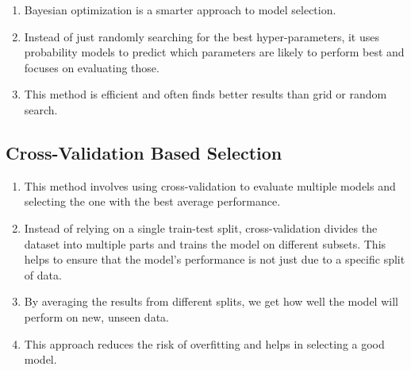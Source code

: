 \begin{enumerate}
    \item Bayesian optimization is a smarter approach to model selection.
    \hfill \cite{geeksforgeeks/machine-learning/model-selection-for-machine-learning}

    \item Instead of just randomly searching for the best hyper-parameters, it uses probability models to predict which parameters are likely to perform best and focuses on evaluating those.
    \hfill \cite{geeksforgeeks/machine-learning/model-selection-for-machine-learning}

    \item This method is efficient and often finds better results than grid or random search.
    \hfill \cite{geeksforgeeks/machine-learning/model-selection-for-machine-learning}
\end{enumerate}



\subsection{Cross-Validation Based Selection}

\begin{enumerate}
    \item This method involves using cross-validation to evaluate multiple models and selecting the one with the best average performance.
    \hfill \cite{geeksforgeeks/machine-learning/model-selection-for-machine-learning}

    \item Instead of relying on a single train-test split, cross-validation divides the dataset into multiple parts and trains the model on different subsets.
    This helps to ensure that the model’s performance is not just due to a specific split of data.
    \hfill \cite{geeksforgeeks/machine-learning/model-selection-for-machine-learning}

    \item By averaging the results from different splits, we get how well the model will perform on new, unseen data.
    \hfill \cite{geeksforgeeks/machine-learning/model-selection-for-machine-learning}

    \item This approach reduces the risk of overfitting and helps in selecting a good model.
    \hfill \cite{geeksforgeeks/machine-learning/model-selection-for-machine-learning}
\end{enumerate}




